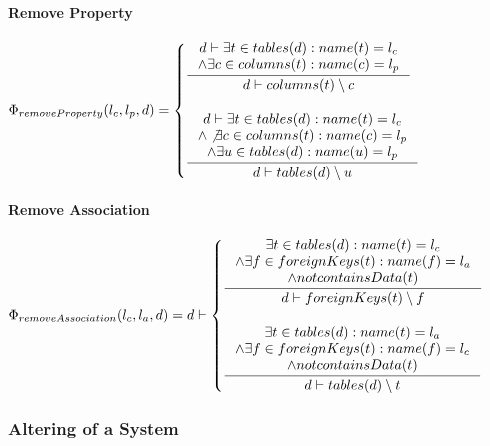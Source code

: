 \documentclass[11pt]{article}
\begin{document}
\paragraph{Remove Property}
$
\Phi_{removeProperty}(l_c, l_p, d) = \begin{cases}
 \inference{d \vdash \exists t \in tables(d) : name(t) = l_c \\ \wedge \exists c \in columns(t) : name(c) = l_p  }{d \vdash
columns(t) \setminus c
} \\ \\
  \inference{d \vdash \exists t \in tables(d) : name(t) = l_c \\ \wedge \not \exists c \in columns(t) : name(c) = l_p \\ \wedge \exists u \in tables(d) : name(u) = l_p }{d \vdash tables(d) \setminus u }
 \end{cases}
$

\paragraph{Remove Association}
$
\Phi_{removeAssociation}(l_c, l_a, d) = d \vdash \begin{cases}
 \inference{\exists t \in tables(d) : name(t) = l_c 
 \\ \wedge \exists f \in foreignKeys(t) : name(f) = l_a 
 \\ \wedge not containsData(t)}{d \vdash foreignKeys(t) \setminus f }
 \\ \\
 \inference{\exists t \in tables(d) : name(t) = l_a 
 \\ \wedge \exists f \in foreignKeys(t) : name(f) = l_c
 \\ \wedge not containsData(t)}{d \vdash tables(d) \setminus t}
 \end{cases}
$

\subsubsection{Altering of a System}	
\end{document}
